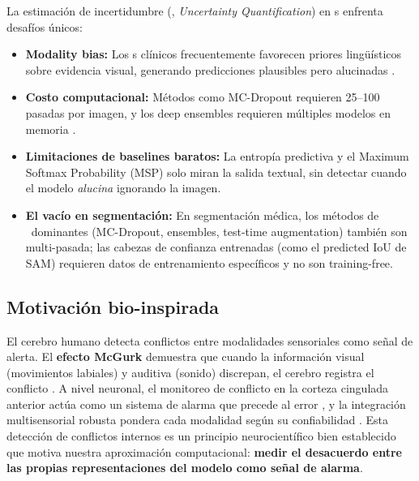 \documentclass[12pt,a4paper]{article}
\newcommand{\VLM}{\text{VLM}}
\newcommand{\UQ}{\text{UQ}}
\newcommand{\MedVLM}{\text{MedVLM}}
\begin{document}
La estimación de incertidumbre (\UQ, \textit{Uncertainty Quantification}) en \MedVLM s enfrenta desafíos únicos:

\begin{itemize}[leftmargin=2em]
    \item \textbf{Modality bias:} Los \VLM s clínicos frecuentemente favorecen priores lingüísticos sobre evidencia visual, generando predicciones plausibles pero alucinadas \citep{modalitybias2025}.

    \item \textbf{Costo computacional:} Métodos como MC-Dropout requieren 25--100 pasadas por imagen, y los deep ensembles requieren múltiples modelos en memoria \citep{gal2016dropout, lakshminarayanan2017ensembles}.

    \item \textbf{Limitaciones de baselines baratos:} La entropía predictiva y el Maximum Softmax Probability (MSP) solo miran la salida textual, sin detectar cuando el modelo \textit{alucina} ignorando la imagen.

    \item \textbf{El vacío en segmentación:} En segmentación médica, los métodos de \UQ\ dominantes (MC-Dropout, ensembles, test-time augmentation) también son multi-pasada; las cabezas de confianza entrenadas (como el predicted IoU de SAM) requieren datos de entrenamiento específicos y no son training-free.
\end{itemize}

\subsection{Motivación bio-inspirada}

El cerebro humano detecta conflictos entre modalidades sensoriales como señal de alerta.
El \textbf{efecto McGurk} demuestra que cuando la información visual (movimientos labiales) y auditiva (sonido) discrepan, el cerebro registra el conflicto \citep{mcgurk1976}.
A nivel neuronal, el monitoreo de conflicto en la corteza cingulada anterior actúa como un sistema de alarma que precede al error \citep{botvinick2001conflict, yeung2004conflict}, y la integración multisensorial robusta pondera cada modalidad según su confiabilidad \citep{ernst2004integration}.
Esta detección de conflictos internos es un principio neurocientífico bien establecido que motiva nuestra aproximación computacional: \textbf{medir el desacuerdo entre las propias representaciones del modelo como señal de alarma}.
\end{document}
